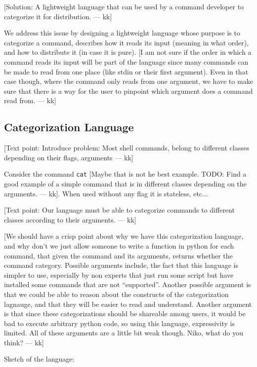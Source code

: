 \documentclass[sigplan,10pt,review,anonymous]{acmart}
\newcommand{\kk}[1]{[{\color{magenta}#1 --- kk}]}
\begin{document}
\kk{Solution: A lightweight language that can be used by a command
  developer to categorize it for distribution.}

We address this issue by designing a lightweight language whose
purpose is to categorize a command, describes how it reads its input
(meaning in what order), and how to distribute it (in case it is
pure). \kk{I am not sure if the order in which a command reads its
  input will be part of the language since many commands can be made
  to read from one place (like stdin or their first argument). Even in
  that case though, where the command only reads from one argument, we
  have to make sure that there is a way for the user to pinpoint which
  argument does a command read from.}

\subsection{Categorization Language}

\kk{Text point: Introduce problem: Most shell commands, belong to
  different classes depending on their flags, arguments}

Consider the command \texttt{cat} \kk{Maybe that is not he best
  example. TODO: Find a good example of a simple command that is in
  different classes depending on the arguments.}. When used without
any flag it is stateless, etc...

\kk{Text point: Our language must be able to categorize commands to
  different classes according to their arguments.}

\kk{We should have a crisp point about why we have this categorization
  language, and why don't we just allow someone to write a function in
  python for each command, that given the command and its arguments,
  returns whether the command category. Possible arguments include,
  the fact that this language is simpler to use, especially by non
  experts that just run some script but have installed some commands
  that are not ``supported''. Another possible argument is that we
  could be able to reason about the constructs of the categorization
  lagnauge, and that they will be easier to read and
  understand. Another argument is that since these categorizations
  should be shareable among users, it would be bad to execute
  arbitrary python code, so using this language, expressivity is
  limited. All of these arguments are a little bit weak though. Niko,
  what do you think?}

Sketch of the language:
\end{document}
